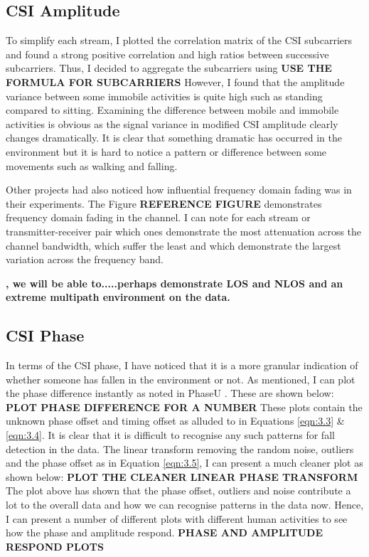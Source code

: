 \subsection{CSI Amplitude}
To simplify each stream, I plotted the correlation matrix of the CSI subcarriers and found a strong positive correlation and high ratios between successive subcarriers. Thus, I decided to aggregate the subcarriers using \textbf{USE THE FORMULA FOR SUBCARRIERS}
However, I found that the amplitude variance between some immobile activities is quite high such as standing compared to sitting. Examining the difference between mobile and immobile activities is obvious as the signal variance in modified CSI amplitude clearly changes dramatically. It is clear that something dramatic has occurred in the environment but it is hard to notice a pattern or difference between some movements such as walking and falling.  \par
Other projects had also noticed how influential frequency domain fading was in their experiments. The Figure \textbf{REFERENCE FIGURE} demonstrates frequency domain fading in the channel. I can note for each stream or transmitter-receiver pair which ones demonstrate the most attenuation across the channel bandwidth, which suffer the least and which demonstrate the largest variation across the frequency band. 

\textbf{, we will be able to.....perhaps demonstrate LOS and NLOS and an extreme multipath environment on the data. }
\subsection{CSI Phase}
In terms of the CSI phase, I have noticed that it is a more granular indication of whether someone has fallen in the environment or not. As mentioned, I can plot the phase difference instantly as noted in PhaseU \citep{PhaseU}. These are shown below:
\textbf{PLOT PHASE DIFFERENCE FOR A NUMBER }
These plots contain the unknown phase offset and timing offset as alluded to in Equations \ref{eqn:3.3} \& \ref{eqn:3.4}. It is clear that it is difficult to recognise any such patterns for fall detection in the data. The linear transform removing the random noise, outliers and the phase offset as in Equation \ref{eqn:3.5}, I can present a much cleaner plot as shown below:
\textbf{PLOT THE CLEANER LINEAR PHASE TRANSFORM}
The plot above has shown that the phase offset, outliers and noise contribute a lot to the overall data and how we can recognise patterns in the data now. Hence, I can present a number of different plots with different human activities to see how the phase and amplitude respond. 
\textbf{PHASE AND AMPLITUDE RESPOND PLOTS}
